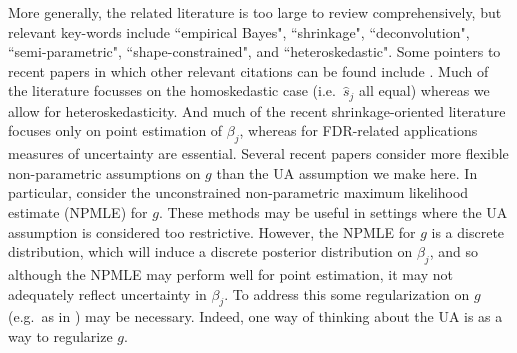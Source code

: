\documentclass[11pt]{article}
\def\bhat{\hat{\beta}}
\def\shat{\hat{s}}
\begin{document}
More generally, the related literature is too large to review comprehensively, but relevant key-words include ``empirical Bayes", ``shrinkage", ``deconvolution", ``semi-parametric", ``shape-constrained", and ``heteroskedastic". Some pointers to recent papers in which other relevant
citations can be found include \cite{xie2012sure, sarkar:2014, koenker2014convex, efron2016empirical}. 
Much of the literature focusses on the homoskedastic case (i.e.~$\shat_j$ all equal) whereas we allow for heteroskedasticity. And much of the recent shrinkage-oriented literature focuses only on point estimation of $\beta_j$, whereas for FDR-related applications measures of uncertainty are essential. Several recent papers consider more flexible non-parametric assumptions on 
$g$ than the UA assumption we make here. In particular, \cite{jiang2009general,koenker2014convex} consider the unconstrained non-parametric maximum likelihood
estimate (NPMLE) for $g$. These methods may be useful in settings where the UA assumption is considered too restrictive. However, the  NPMLE for $g$ is a discrete distribution, which will induce a discrete posterior distribution on $\beta_j$, and so although the NPMLE
may perform well for point estimation, it may not adequately reflect uncertainty in $\beta_j$. To address this 
some regularization on $g$ (e.g.~as in \cite{efron2016empirical}) may be necessary.
Indeed, one way of thinking about the UA is as a way to regularize $g$.


\end{document}
